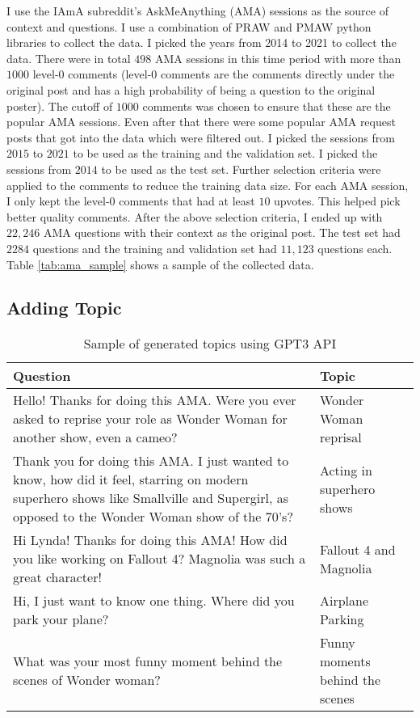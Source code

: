 \documentclass[paper=a4, fontsize=11pt]{scrartcl}
\numberwithin{equation}{section}		%
\numberwithin{figure}{section}			%
\numberwithin{table}{section}				%
\begin{document}
I use the IAmA subreddit's AskMeAnything (AMA) sessions as the source of context and questions.
I use a combination of PRAW and PMAW python libraries to collect the data.
I picked the years from 2014 to 2021 to collect the data.
There were in total $498$ AMA sessions in this time period with more than $1000$ level-0 comments (level-0 comments are the comments directly under the original post and has a high probability of being a question to the original poster).
The cutoff of $1000$ comments was chosen to ensure that these are the popular AMA sessions.
Even after that there were some popular AMA request posts that got into the data which were filtered out.
I picked the sessions from $2015$ to $2021$ to be used as the training and the validation set.
I picked the sessions from $2014$ to be used as the test set.
Further selection criteria were applied to the comments to reduce the training data size.
For each AMA session, I only kept the level-0 comments that had at least $10$ upvotes.
This helped pick better quality comments.
After the above selection criteria, I ended up with $22,246$ AMA questions with their context as the original post.
The test set had $2284$ questions and the training and validation set had $11,123$ questions each.
Table \ref{tab:ama_sample} shows a sample of the collected data.

\subsection*{Adding Topic}
\begin{table}
\centering
\scriptsize
\begin{tabular}{m{6cm}m{3cm}}
  \hline
  Question & Topic \\
  \hline
  \hline
  Hello! Thanks for doing this AMA. Were you ever asked to reprise your role as Wonder Woman for another show, even a cameo? &  Wonder Woman reprisal \\
  \hline
Thank you for doing this AMA. I just wanted to know, how did it feel, starring on modern superhero shows like Smallville and Supergirl, as opposed to the Wonder Woman show of the 70's? &  Acting in superhero shows \\
\hline
Hi Lynda! Thanks for doing this AMA! How did you like working on Fallout 4? Magnolia was such a great character! &  Fallout 4 and Magnolia \\
\hline
Hi, I just want to know one thing. Where did you park your plane? &  Airplane Parking \\
\hline
What was your most funny moment behind the scenes of Wonder woman? &  Funny moments behind the scenes \\
  \hline
  \hline
  \end{tabular}
  \caption{Sample of generated topics using GPT3 API}
  \label{tab:topic_sample}
\end{table}
\end{document}
